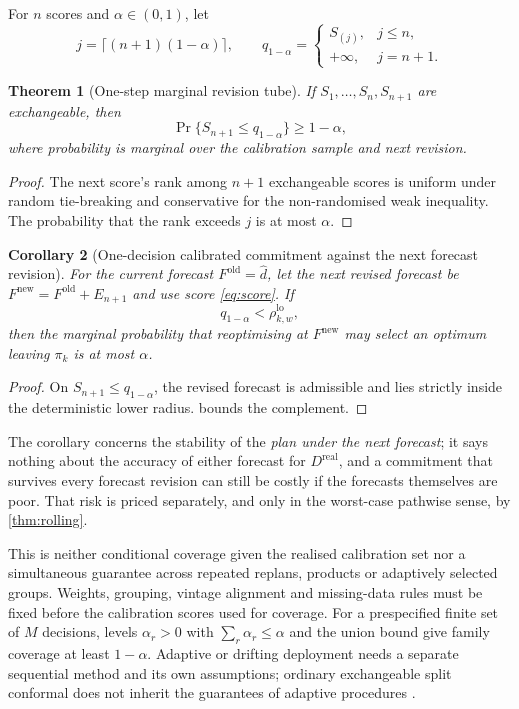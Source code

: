 \documentclass[11pt]{article}
\newtheorem{theorem}{Theorem}[section]
\newtheorem{corollary}[theorem]{Corollary}
\theoremstyle{definition}
\newcommand{\dhat}{\widehat d}
\newcommand{\rholo}{\rho^{\mathrm{lo}}}
\begin{document}
For $n$ scores and $\alpha\in(0,1)$, let
\[
j=\lceil(n+1)(1-\alpha)\rceil,
\qquad
q_{1-\alpha}=\begin{cases}S_{(j)},&j\le n,\\+\infty,&j=n+1.\end{cases}
\]

\begin{theorem}[One-step marginal revision tube]\label{thm:conformal}
If $S_1,\ldots,S_n,S_{n+1}$ are exchangeable, then
\[
\Pr\{S_{n+1}\le q_{1-\alpha}\}\ge1-\alpha,
\]
where probability is marginal over the calibration sample and next revision.
\end{theorem}

\begin{proof}
The next score's rank among $n+1$ exchangeable scores is uniform under random tie-breaking and conservative for the non-randomised weak inequality. The probability that the rank exceeds $j$ is at most $\alpha$.
\end{proof}

\begin{corollary}[One-decision calibrated commitment against the next forecast revision]\label{cor:commit}
For the current forecast $F^{\mathrm{old}}=\dhat$, let the next revised forecast be $F^{\mathrm{new}}=F^{\mathrm{old}}+E_{n+1}$ and use score \eqref{eq:score}. If
\begin{equation}\label{eq:commit}
q_{1-\alpha}<\rholo_{k,w},
\end{equation}
then the marginal probability that reoptimising at $F^{\mathrm{new}}$ may select an optimum leaving $\pi_k$ is at most $\alpha$.
\end{corollary}

\begin{proof}
On $S_{n+1}\le q_{1-\alpha}$, the revised forecast is admissible and lies strictly inside the deterministic lower radius.  bounds the complement.
\end{proof}

The corollary concerns the stability of the \emph{plan under the next forecast}; it says nothing about the accuracy of either forecast for $D^{\mathrm{real}}$, and a commitment that survives every forecast revision can still be costly if the forecasts themselves are poor. That risk is priced separately, and only in the worst-case pathwise sense, by \cref{thm:rolling}.

This is neither conditional coverage given the realised calibration set nor a simultaneous guarantee across repeated replans, products or adaptively selected groups. Weights, grouping, vintage alignment and missing-data rules must be fixed before the calibration scores used for coverage. For a prespecified finite set of $M$ decisions, levels $\alpha_r>0$ with $\sum_r\alpha_r\le\alpha$ and the union bound give family coverage at least $1-\alpha$. Adaptive or drifting deployment needs a separate sequential method and its own assumptions; ordinary exchangeable split conformal does not inherit the guarantees of adaptive procedures \parencite{BarberEtAl2023,GibbsCandes2021}.
\end{document}
